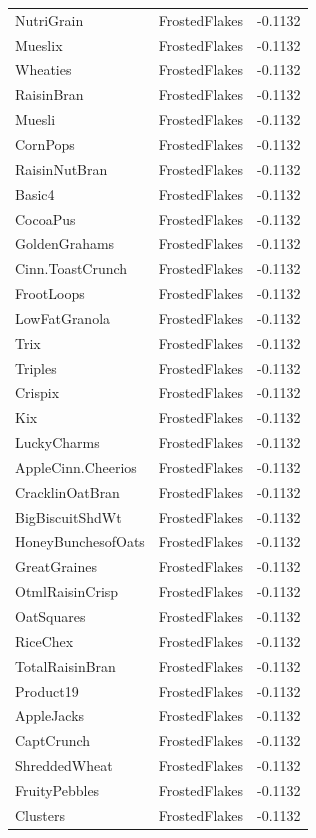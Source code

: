 \begin{longtable}{llr}
NutriGrain & FrostedFlakes & -0.1132 \\
Mueslix & FrostedFlakes & -0.1132 \\
Wheaties & FrostedFlakes & -0.1132 \\
RaisinBran & FrostedFlakes & -0.1132 \\
Muesli & FrostedFlakes & -0.1132 \\
CornPops & FrostedFlakes & -0.1132 \\
RaisinNutBran & FrostedFlakes & -0.1132 \\
Basic4 & FrostedFlakes & -0.1132 \\
CocoaPus & FrostedFlakes & -0.1132 \\
GoldenGrahams & FrostedFlakes & -0.1132 \\
Cinn.ToastCrunch & FrostedFlakes & -0.1132 \\
FrootLoops & FrostedFlakes & -0.1132 \\
LowFatGranola & FrostedFlakes & -0.1132 \\
Trix & FrostedFlakes & -0.1132 \\
Triples & FrostedFlakes & -0.1132 \\
Crispix & FrostedFlakes & -0.1132 \\
Kix & FrostedFlakes & -0.1132 \\
LuckyCharms & FrostedFlakes & -0.1132 \\
AppleCinn.Cheerios & FrostedFlakes & -0.1132 \\
CracklinOatBran & FrostedFlakes & -0.1132 \\
BigBiscuitShdWt & FrostedFlakes & -0.1132 \\
HoneyBunchesofOats & FrostedFlakes & -0.1132 \\
GreatGraines & FrostedFlakes & -0.1132 \\
OtmlRaisinCrisp & FrostedFlakes & -0.1132 \\
OatSquares & FrostedFlakes & -0.1132 \\
RiceChex & FrostedFlakes & -0.1132 \\
TotalRaisinBran & FrostedFlakes & -0.1132 \\
Product19 & FrostedFlakes & -0.1132 \\
AppleJacks & FrostedFlakes & -0.1132 \\
CaptCrunch & FrostedFlakes & -0.1132 \\
ShreddedWheat & FrostedFlakes & -0.1132 \\
FruityPebbles & FrostedFlakes & -0.1132 \\
Clusters & FrostedFlakes & -0.1132 \\

\end{longtable}
